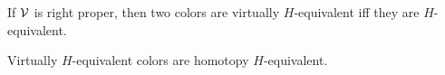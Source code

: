 \documentclass[a4paper,10pt
,draft
]{article}%
\newcommand{\I}{\mathbb I}
\newcommand{\J}{\mathbb J}
\renewcommand{\1}{\eta}%
\begin{document}

        
        
        

\begin{lemma}
      \label{RIGHTPROPER_LEM}
      If $\mathcal V$ is right proper, then two colors are virtually $H$-equivalent iff they are $H$-equivalent. 
\end{lemma}


\begin{lemma}
      \label{VIR_HTPY_LEM}
      Virtually $H$-equivalent colors are homotopy $H$-equivalent. 
\end{lemma}
\end{document}
